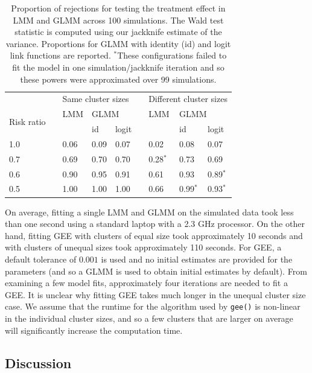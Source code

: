 \documentclass[10pt]{article}
\begin{document}
\begin{table}[H]
\centering
\begin{tabular}{@{}lclllclll@{}}
\toprule
&& \multicolumn{3}{l}{Same cluster sizes} && \multicolumn{3}{l}{Different cluster sizes} \\
\cmidrule{3-5}\cmidrule{7-9}
\multirow{2}{*}{\parbox{0.75cm}{Risk ratio}} && LMM & \multicolumn{2}{l}{GLMM} && LMM & \multicolumn{2}{l}{GLMM} \\
\cmidrule{4-5}\cmidrule{8-9}
&& & id & logit && & id & logit \\
\midrule
1.0 && 0.06 & 0.09 & 0.07 && 0.02 & 0.08 & 0.07 \\
0.7 && 0.69 & 0.70 & 0.70 && 0.28$^*$ & 0.73 & 0.69 \\
0.6 && 0.90 & 0.95 & 0.91 && 0.61 & 0.93 & 0.89$^*$\\
0.5 && 1.00 & 1.00 & 1.00 && 0.66 & 0.99$^*$ & 0.93$^*$ \\
\bottomrule
\end{tabular}
\caption{Proportion of rejections for testing the treatment effect in LMM and GLMM across 100 simulations. The Wald test statistic is computed using our jackknife estimate of the variance. Proportions for GLMM with identity (id) and logit link functions are reported. $^{*}$These configurations failed to fit the model in one simulation/jackknife iteration and so these powers were approximated over 99 simulations.}
\label{tab:jackknife}
\end{table}

On average, fitting a single LMM and GLMM on the simulated data took less than one second using a standard laptop with a 2.3 GHz processor. On the other hand, fitting GEE with clusters of equal size took approximately 10 seconds and with clusters of unequal sizes took approximately 110 seconds. For GEE, a default tolerance of $0.001$ is used and no initial estimates are provided for the parameters (and so a GLMM is used to obtain initial estimates by default). From examining a few model fits, approximately four iterations are needed to fit a GEE. It is unclear why fitting GEE takes much longer in the unequal cluster size case. We assume that the runtime for the algorithm used by \verb|gee()| is non-linear in the individual cluster sizes, and so a few clusters that are larger on average will significantly increase the computation time.

\subsection{Discussion}
\end{document}
